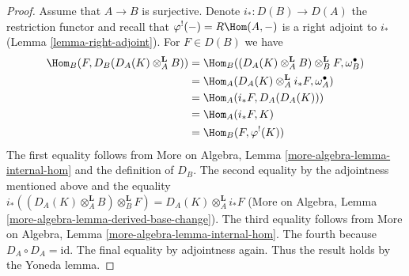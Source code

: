 \begin{proof}
\medskip\noindent
Assume that $A \to B$ is surjective. Denote $i_* : D(B) \to D(A)$
the restriction functor and recall that $\varphi^!(-) = R\Hom(A, -)$
is a right adjoint to $i_*$ (Lemma \ref{lemma-right-adjoint}).
For $F \in D(B)$ we have
\begin{align*}
\Hom_B(F, D_B(D_A(K) \otimes_A^\mathbf{L} B))
& =
\Hom_B((D_A(K) \otimes_A^\mathbf{L} B) \otimes_B^\mathbf{L} F,
\omega_B^\bullet) \\
& =
\Hom_A(D_A(K) \otimes_A^\mathbf{L} i_*F, \omega_A^\bullet) \\
& =
\Hom_A(i_*F, D_A(D_A(K))) \\
& =
\Hom_A(i_*F, K) \\
& =
\Hom_B(F, \varphi^!(K))
\end{align*}
The first equality follows from More on Algebra, Lemma
\ref{more-algebra-lemma-internal-hom} and the definition
of $D_B$. The second equality by the adjointness mentioned
above and the equality
$i_*((D_A(K) \otimes_A^\mathbf{L} B) \otimes_B^\mathbf{L} F) =
D_A(K) \otimes_A^\mathbf{L} i_*F$
(More on Algebra, Lemma \ref{more-algebra-lemma-derived-base-change}).
The third equality follows from More on Algebra, Lemma
\ref{more-algebra-lemma-internal-hom}. The fourth because
$D_A \circ D_A = \text{id}$. The final equality by adjointness again.
Thus the result holds by the Yoneda lemma.
\end{proof}